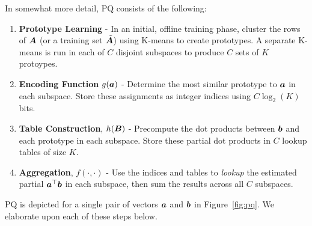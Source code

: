 In somewhat more detail, PQ consists of the following:
\vspace{-3mm}
\begin{enumerate}\itemsep.5mm
    \item \textbf{Prototype Learning} - In an initial, offline training phase,  cluster the rows of $\bm{A}$ (or a training set $\tilde{\bm{A}}$) using K-means to create prototypes. A separate K-means is run in each of $C$ disjoint subspaces to produce $C$ sets of $K$ protoypes. %
    \item \textbf{Encoding Function} $g(\bm{a})$ - Determine the most similar prototype to $\bm{a}$ in each subspace. Store these assignments as integer indices using $C \log_2(K)$ bits.
    \item \textbf{Table Construction}, $h(\bm{B})$ - Precompute the dot products between $\bm{b}$ and each prototype in each subspace. Store these partial dot products in $C$ lookup tables of size $K$.
    \item \textbf{Aggregation}, $f(\cdot,\cdot)$ - Use the indices and tables to \textit{lookup} the estimated partial $\bm{a}^\top \bm{b}$ in each subspace, then sum the results across all $C$ subspaces. %
\end{enumerate}
\vspace{-3mm}
PQ is depicted for a single pair of vectors $\bm{a}$ and $\bm{b}$ in Figure~\ref{fig:pq}. We elaborate upon each of these steps below.

\vspace{-2mm}
